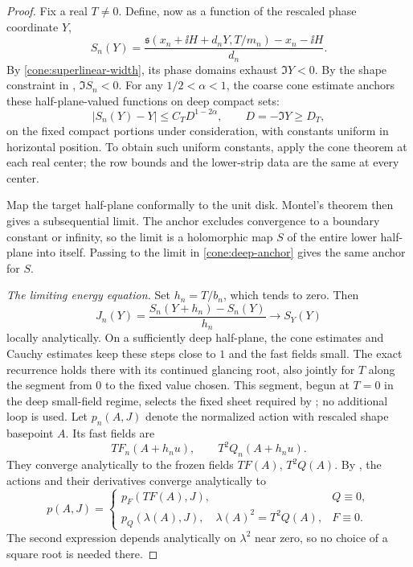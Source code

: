 \begin{proof}
Fix a real \(T\ne0\). Define, now as a function of the rescaled phase
coordinate \(Y\),
\[
 S_n(Y)=\frac{\mathfrak s(x_n+\ii H+d_nY,T/m_n)-x_n-\ii H}{d_n}.
\]
By \eqref{cone:superlinear-width}, its phase domains exhaust
\(\Im Y<0\). By the shape constraint in ,
\(\Im S_n<0\). For any \(1/2<\alpha<1\), the coarse cone estimate
anchors these half-plane-valued functions on deep compact sets:
\begin{equation}\label{cone:deep-anchor}
 |S_n(Y)-Y|\le C_TD^{1-2\alpha},\qquad D=-\Im Y\ge D_T,
\end{equation}
on the fixed compact portions under consideration, with constants
uniform in horizontal position. To obtain such uniform constants,
apply the cone theorem at each real center; the row bounds and the
lower-strip data are the same at every center.

Map the target half-plane conformally to the unit disk. Montel's theorem
then gives a subsequential limit. The anchor excludes convergence to
a boundary constant or infinity, so the limit is a holomorphic map
\(S\) of the entire lower half-plane into itself. Passing to the limit
in \eqref{cone:deep-anchor} gives the same anchor for \(S\).

\medskip\noindent
\emph{The limiting energy equation.}
Set \(h_n=T/b_n\), which tends to zero. Then
\[
 J_n(Y)=\frac{S_n(Y+h_n)-S_n(Y)}{h_n}\longrightarrow S_Y(Y)
\]
locally analytically. On a sufficiently deep half-plane, the cone
estimates and Cauchy estimates keep these steps close to \(1\) and the
fast fields small. The exact recurrence holds there with its continued
glancing root, also jointly for \(T\) along the segment from \(0\) to
the fixed value chosen. This segment, begun at \(T=0\) in the deep
small-field regime, selects the fixed sheet required by
; no additional loop is used.
Let \(p_n(A,J)\) denote the normalized action
with rescaled shape basepoint \(A\). Its fast fields are
\[
 T F_n(A+h_nu),\qquad T^2Q_n(A+h_nu).
\]
They converge analytically to the frozen fields
\(TF(A)\), \(T^2Q(A)\). By
, the actions and their
derivatives converge analytically to
\[
 p(A,J)=
 \begin{cases}
 p_F(TF(A),J),&Q\equiv0,\\
 p_Q(\lambda(A),J),\quad\lambda(A)^2=T^2Q(A),&F\equiv0.
 \end{cases}
\]
The second expression depends analytically on \(\lambda^2\) near zero,
so no choice of a square root is needed there.


\end{proof}
